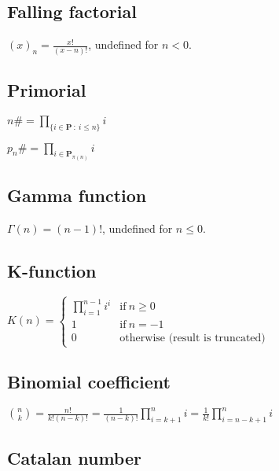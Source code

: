 \subsection{Falling factorial}
\label{sec:Falling factorial}

\( \displaystyle{
    (x)_n = \frac{x!}{(x - n)!}
}\), undefined for $n < 0$.


\subsection{Primorial}
\label{sec:Primorial}

\( \displaystyle{
    n\# = \prod_{\lbrace i \in \textbf{P} ~:~ i \le n \rbrace} i
}\)
\vspace{1em}

\noindent
\( \displaystyle{
    p_n\# = \prod_{i \in \textbf{P}_{\pi(n)}} i
}\)


\subsection{Gamma function}
\label{sec:Gamma function}

$\Gamma(n) = (n - 1)!$, undefined for $n \le 0$.


\subsection{K-function}
\label{sec:K-function}

\( \displaystyle{
    K(n) = \left \lbrace \begin{array}{ll}
      \displaystyle{\prod_{i = 1}^{n - 1} i^i}  & \textrm{if}~ n \ge 0 \\
      1 & \textrm{if}~ n = -1 \\
      0 & \textrm{otherwise (result is truncated)}
    \end{array} \right .
}\)


\subsection{Binomial coefficient}
\label{sec:Binomial coefficient}

\( \displaystyle{
    \binom{n}{k} = \frac{n!}{k!(n - k)!}
    = \frac{1}{(n - k)!} \prod_{i = k + 1}^n i
    = \frac{1}{k!} \prod_{i = n - k + 1}^n i
}\)


\subsection{Catalan number}
\label{sec:Catalan number}

